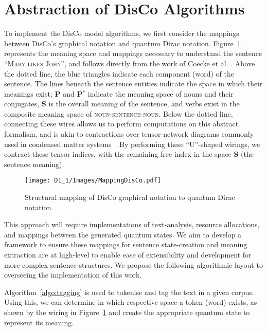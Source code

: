 \section{Abstraction of DisCo Algorithms}
\label{sec:abstraction_of_disco_algorithms}
To implement the DisCo model algorithms, we first consider the mappings between DisCo's graphical notation and quantum Dirac notation. Figure~\ref{fig:disco_dirac} represents the meaning space and mappings necessary to understand the sentence ``\textsc{Mary likes John}'', and follows directly from the work of Coecke et al. \cite{Coecke_Sadrzadeh_Clark_2010}. Above the dotted line, the blue triangles indicate each component (word) of the sentence. The lines beneath the sentence entities indicate the space in which their meanings exist; \textbf{P} and \textbf{P$^*$} indicate the meaning space of nouns and their conjugates, \textbf{S} is the overall meaning of the sentence, and verbs exist in the composite meaning space of \textsc{noun-sentence-noun}. Below the dotted line, connecting these wires allows us to perform computations on this abstract formalism, and is akin to contractions over tensor-network diagrams commonly used in condensed matter systems~\cite{ Coecke_Paquette_Pavlovic_2009,Biamonte_Clark_Jaksch_2011}. By performing these ``U''-shaped wirings, we contract these tensor indices, with the remaining free-index in the space \textbf{S} (the sentence meaning).

\begin{figure}[H]
    \centering
    \texttt{[image: D1\_1/Images/MappingDisCo.pdf]}
    \caption{Structural mapping of DisCo graphical notation to quantum Dirac notation. }
    \label{fig:disco_dirac}
\end{figure}

This approach will require implementations of text-analysis, resource allocations, and mappings between the generated quantum states. We aim to develop a framework to ensure these mappings for sentence state-creation and meaning extraction are at high-level to enable ease of extensibility and development for more complex sentence structures. We propose the following algorithmic layout to overseeing the implementation of this work.

Algorithm~\ref{algo:tagging} is used to tokenise and tag the text in a given corpus. Using this, we can determine in which respective space a token (word) exists, as shown by the wiring in Figure~\ref{fig:disco_dirac} and create the appropriate quantum state to represent its meaning.

